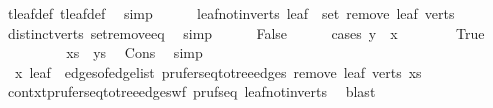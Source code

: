 \begin{isabellebody}
\ t{}{\isachardot}{\kern0pt}leaf{\isacharunderscore}{\kern0pt}def\ t{}{\isachardot}{\kern0pt}leaf{\isacharunderscore}{\kern0pt}def\ \isamarkupfalse%
\ simp\isanewline
\ \ \ \ \isamarkupfalse%
\ leaf{\isacharunderscore}{\kern0pt}not{\isacharunderscore}{\kern0pt}in{\isacharunderscore}{\kern0pt}verts{\isacharprime}{\kern0pt}{\isacharcolon}{\kern0pt}\ {\isachardoublequoteopen}leaf\ {\isasymnotin}\ set\ {\isacharparenleft}{\kern0pt}remove{}\ leaf\ verts{\isacharparenright}{\kern0pt}{\isachardoublequoteclose}\ \isamarkupfalse%
\ distinct{\isacharunderscore}{\kern0pt}verts\ set{\isacharunderscore}{\kern0pt}remove{}{\isacharunderscore}{\kern0pt}eq\ \isamarkupfalse%
\ simp\isanewline
\ \ \ \ \isamarkupfalse%
\ False\isanewline
\ \ \ \ \isamarkupfalse%
\ {\isacharparenleft}{\kern0pt}cases\ {\isachardoublequoteopen}y\ {\isacharequal}{\kern0pt}\ x{\isachardoublequoteclose}{\isacharparenright}{\kern0pt}\isanewline
\ \ \ \ \ \ \isamarkupfalse%
\ True\isanewline
\ \ \ \ \ \ \isamarkupfalse%
\ \isamarkupfalse%
\ {\isachardoublequoteopen}xs\ {\isasymnoteq}\ ys{\isachardoublequoteclose}\ \isamarkupfalse%
\ Cons\ \isamarkupfalse%
\ simp\isanewline
\ \ \ \ \ \ \isamarkupfalse%
\ {}{\isacharcolon}{\kern0pt}\ {\isachardoublequoteopen}{\isacharbraceleft}{\kern0pt}x{\isacharcomma}{\kern0pt}\ leaf{\isacharbraceright}{\kern0pt}\ {\isasymnotin}\ edges{\isacharunderscore}{\kern0pt}of{\isacharunderscore}{\kern0pt}edge{\isacharunderscore}{\kern0pt}list\ {\isacharparenleft}{\kern0pt}prufer{\isacharunderscore}{\kern0pt}seq{\isacharunderscore}{\kern0pt}to{\isacharunderscore}{\kern0pt}tree{\isacharunderscore}{\kern0pt}edges\ {\isacharparenleft}{\kern0pt}remove{}\ leaf\ verts{\isacharparenright}{\kern0pt}\ xs{\isacharparenright}{\kern0pt}{\isachardoublequoteclose}\ \isamarkupfalse%
\ contxt{\isacharprime}{\kern0pt}{\isachardot}{\kern0pt}prufer{\isacharunderscore}{\kern0pt}seq{\isacharunderscore}{\kern0pt}to{\isacharunderscore}{\kern0pt}tree{\isacharunderscore}{\kern0pt}edges{\isacharunderscore}{\kern0pt}wf\ pruf{\isacharunderscore}{\kern0pt}seq{}{\isacharprime}{\kern0pt}\ leaf{\isacharunderscore}{\kern0pt}not{\isacharunderscore}{\kern0pt}in{\isacharunderscore}{\kern0pt}verts{\isacharprime}{\kern0pt}\ \isamarkupfalse%
\ blast\isanewline
\ \ \ \ \ \ \isamarkupfalse%

\end{isabellebody}
